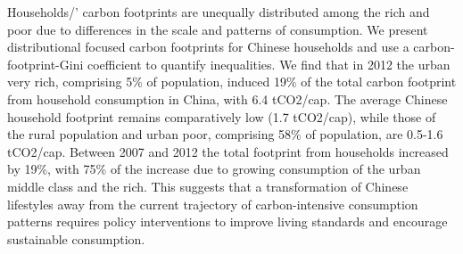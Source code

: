 Households/' carbon footprints are unequally distributed among the rich and poor due to differences in the scale and patterns of consumption. We present distributional focused carbon footprints for Chinese households and use a carbon-footprint-Gini coefficient to quantify inequalities. We find that in 2012 the urban very rich, comprising 5\% of population, induced 19\% of the total carbon footprint from household consumption in China, with 6.4 tCO2/cap. The average Chinese household footprint remains comparatively low (1.7 tCO2/cap), while those of the rural population and urban poor, comprising 58\% of population, are 0.5-1.6 tCO2/cap. Between 2007 and 2012 the total footprint from households increased by 19\%, with 75\% of the increase due to growing consumption of the urban middle class and the rich. This suggests that a transformation of Chinese lifestyles away from the current trajectory of carbon-intensive consumption patterns requires policy interventions to improve living standards and encourage sustainable consumption.
